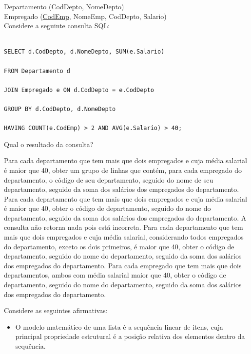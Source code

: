 \documentclass[12pt, addpoints]{exam}
\begin{document}
\begin{questions}
Departamento (\underline{CodDepto}, NomeDepto)\\

Empregado (\underline{CodEmp}, NomeEmp, CodDepto, Salario)\\

Considere a seguinte consulta SQL:

\begin{verbatim}

SELECT d.CodDepto, d.NomeDepto, SUM(e.Salario)

FROM Departamento d

JOIN Empregado e ON d.CodDepto = e.CodDepto

GROUP BY d.CodDepto, d.NomeDepto

HAVING COUNT(e.CodEmp) > 2 AND AVG(e.Salario) > 40;

\end{verbatim}



Qual o resultado da consulta?
\begin{choices}
\choice Para cada departamento que tem mais que dois empregados e cuja média salarial é maior que 40, obter um grupo de linhas que contém, para cada empregado do departamento, o código de seu departamento, seguido do nome de seu departamento, seguido da soma dos salários dos empregados do departamento.
\choice Para cada departamento que tem mais que dois empregados e cuja média salarial é maior que 40, obter o código de departamento, seguido do nome do departamento, seguido da soma dos salários dos empregados do departamento.
\choice A consulta não retorna nada pois está incorreta.
\choice Para cada departamento que tem mais que dois empregados e cuja média salarial, considerando todos empregados do departamento, exceto os dois primeiros, é maior que 40, obter o código de departamento, seguido do nome do departamento, seguido da soma dos salários dos empregados do departamento.
\choice Para cada empregado que tem mais que dois departamentos, ambos com média salarial maior que 40, obter o código de departamento, seguido do nome do departamento, seguido da soma dos salários dos empregados do departamento.
\end{choices}

\question

Considere as seguintes afirmativas:

\begin{itemize}

    \item O modelo matemático de uma lista é a sequência linear de itens, cuja principal propriedade estrutural é a posição relativa dos elementos dentro da sequência.


\end{itemize}
\end{questions}
\end{document}
